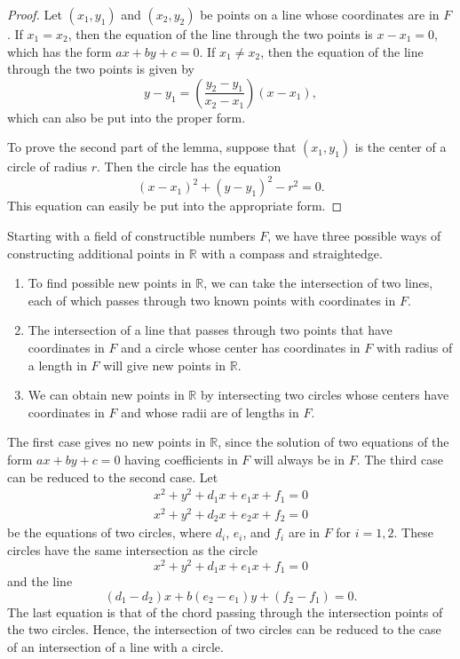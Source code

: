 \begin{proof}
Let $(x_1, y_1)$ and $(x_2, y_2)$ be points on a line whose
coordinates are in $F$.  If $x_1 = x_2$, then the equation of the line
through the two points is $x - x_1 = 0$, which has the form $a x + by +
c = 0$.  If $x_1 \neq x_2$, then the equation of the line through the
two points is given by  
\[
y - y_1 = \left( \frac{y_2 - y_1}{x_2 - x_1} \right) (x - x_1),
\]
which can also be put into the proper form.


To prove the second part of the lemma, suppose that $(x_1, y_1)$ is the
center of a circle of radius $r$.  Then the circle has the equation
\[
(x - x_1)^2 + (y - y_1)^2 - r^2 = 0.
\]
This equation can easily be put into the appropriate form.
\end{proof}


\medskip


Starting with a field of constructible numbers $F$, we have three 
possible ways of constructing additional points in ${\mathbb R}$ with a
compass and straightedge. 
\begin{enumerate}
 
\item 
To find possible new points in ${\mathbb R}$, we can take the
intersection of two lines, each of which passes through two known
points with coordinates in $F$. 
 
\item 
The intersection of a line that passes through two points that have 
coordinates in $F$ and a circle whose center has coordinates in $F$ 
with radius of a length in $F$ will give new points in ${\mathbb R}$.
 
\item 
We can obtain new points in ${\mathbb R}$ by intersecting two
circles whose centers have coordinates in $F$ and whose radii are of
lengths in $F$.
 
\end{enumerate}
The first case gives no new points in ${\mathbb R}$, since the solution 
of two equations of the form $a x + by + c = 0$ having coefficients in
$F$ will always be in $F$. The third case can be reduced to the second
case.  Let
\begin{align*}
x^2 + y^2 + d_1 x +e_1 x + f_1 = 0 \\
x^2 + y^2 + d_2 x +e_2 x + f_2 = 0
\end{align*}
be the equations of two circles, where $d_i$, $e_i$, and $f_i$ are in
$F$ for $i = 1, 2$. These circles have the same intersection as the
circle  
\[
x^2 + y^2 + d_1 x +e_1 x + f_1 = 0 
\] and the line
\[
(d_1 - d_2) x + b(e_2 - e_1)y + (f_2 - f_1) = 0.
\]
The last equation is that of the chord passing through the
intersection points of the two circles. Hence, the intersection of two
circles can be reduced to the case of an intersection of a line with a
circle. 
 

